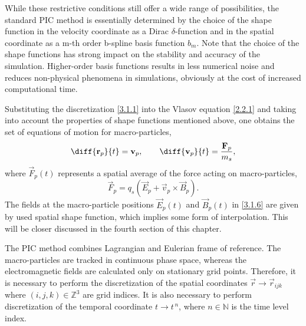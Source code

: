 While these restrictive conditions still offer a wide range of possibilities, the standard PIC method is essentially determined by the choice of the shape function in the velocity coordinate as a Dirac $ \delta $-function and in the spatial coordinate as a m-th order b-spline basis function $ b_{m} $.
Note that the choice of the shape functions has strong impact on the stability and accuracy of the simulation. Higher-order basis functions results in less numerical noise and reduces non-physical phenomena in simulations, obviously at the cost of increased computational time.

Substituting the discretization \ref{3.1.1} into the Vlasov equation \ref{2.2.1} and taking into account the properties of shape functions mentioned above, one obtains the set of equations of motion for macro-particles,
\begin{equation}
\label{3.1.5}
\diff{\vec{r}_{p}}{t} = \vec{v}_{p}, \qquad \diff{\vec{v}_{p}}{t} = \frac{\vec{F}_p}{m_s},
\end{equation}
where $ \vec{F}_p \left( t\right) $ represents a spatial average of the force acting on macro-particles,
\begin{equation}
\label{3.1.6}
\vec{F}_p = q_s \left(\vec{E}_p + \vec{v}_p \times \vec{B}_p \right).
\end{equation}
The fields at the macro-particle positions $ \vec{E}_p \left( t\right) $ and $ \vec{B}_p \left( t\right) $ in \ref{3.1.6} are given by used spatial shape function, which implies some form of interpolation. This will be closer discussed in the fourth section of this chapter.

The PIC method combines Lagrangian and Eulerian frame of reference. The macro-particles are tracked in continuous phase space, whereas the electromagnetic fields are calculated only on stationary grid points. Therefore, it is necessary to perform the discretization of the spatial coordinates $ \vec{r} \rightarrow \vec{r}_{i j k} $ where $ (i,j,k) \in \mathbb{Z}^{3} $ are grid indices. It is also necessary to perform discretization of the temporal coordinate $ t \rightarrow t^{\,n} $, where $ n \in \mathbb{N} $ is the time level index. 

